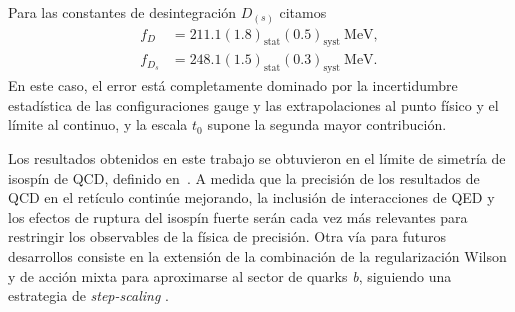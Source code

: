 Para las constantes de desintegración $D_{(s)}$ citamos
\begin{align}
	f_D &= 211.1(1.8)_{\textrm{stat}}(0.5)_{\textrm{syst}} \ \mathrm{MeV},
	\\
	f_{D_s} &= 248.1(1.5)_{\textrm{stat}}(0.3)_{\textrm{syst}} \ \mathrm{MeV}.
\end{align}
En este caso, el error está completamente dominado por la incertidumbre estadística de las configuraciones gauge y las extrapolaciones al punto físico y el límite al continuo, y la escala $t_0$ supone la segunda mayor contribución.

Los resultados obtenidos en este trabajo se obtuvieron en el límite de simetría de isospín de QCD, definido en~\citep{FlavourLatticeAveragingGroupFLAG:2021npn}. A medida que la precisión de los resultados de QCD en el retículo continúe mejorando, la inclusión de interacciones de QED y los efectos de ruptura del isospín fuerte serán cada vez más relevantes para restringir los observables de la física de precisión. Otra vía para futuros desarrollos consiste en la extensión de la combinación de la regularización Wilson y de acción mixta para aproximarse al sector de quarks \textit{b}, siguiendo una estrategia de \textit{step-scaling} \cite{Sommer:2023gap}.



